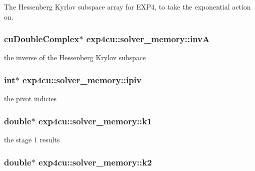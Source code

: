 The Hessenberg Kyrlov subspace array for E\+X\+P4, to take the exponential action on. 

\subsubsection[{\texorpdfstring{invA}{invA}}]{\setlength{\rightskip}{0pt plus 5cm}cu\+Double\+Complex$\ast$ exp4cu\+::solver\+\_\+memory\+::invA}\hypertarget{structexp4cu_1_1solver__memory_a7e113949ec6861bbdf232d99badd8ed9}{}\label{structexp4cu_1_1solver__memory_a7e113949ec6861bbdf232d99badd8ed9}


the inverse of the Hessenberg Krylov subspace 

\subsubsection[{\texorpdfstring{ipiv}{ipiv}}]{\setlength{\rightskip}{0pt plus 5cm}int$\ast$ exp4cu\+::solver\+\_\+memory\+::ipiv}\hypertarget{structexp4cu_1_1solver__memory_a906f92c7521970bb4682737769d0b854}{}\label{structexp4cu_1_1solver__memory_a906f92c7521970bb4682737769d0b854}


the pivot indicies 

\subsubsection[{\texorpdfstring{k1}{k1}}]{\setlength{\rightskip}{0pt plus 5cm}double$\ast$ exp4cu\+::solver\+\_\+memory\+::k1}\hypertarget{structexp4cu_1_1solver__memory_a184c23b8411b8772b53dae0e6fe99723}{}\label{structexp4cu_1_1solver__memory_a184c23b8411b8772b53dae0e6fe99723}


the stage 1 results 

\subsubsection[{\texorpdfstring{k2}{k2}}]{\setlength{\rightskip}{0pt plus 5cm}double$\ast$ exp4cu\+::solver\+\_\+memory\+::k2}\hypertarget{structexp4cu_1_1solver__memory_a8f4b3ca501187945e4620f44506f6882}{}\label{structexp4cu_1_1solver__memory_a8f4b3ca501187945e4620f44506f6882}


